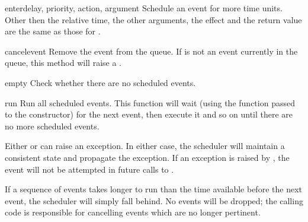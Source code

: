 \begin{methoddesc}{enter}{delay, priority, action, argument}
Schedule an event for  more time units. Other then the
relative time, the other arguments, the effect and the return value
are the same as those for .
\end{methoddesc}

\begin{methoddesc}{cancel}{event}
Remove the event from the queue. If  is not an event
currently in the queue, this method will raise a
.
\end{methoddesc}

\begin{methoddesc}{empty}{}
Check whether there are no scheduled events.
\end{methoddesc}

\begin{methoddesc}{run}{}
Run all scheduled events. This function will wait 
(using the  function passed to the constructor)
for the next event, then execute it and so on until there are no more
scheduled events.

Either  or  can raise an exception.  In
either case, the scheduler will maintain a consistent state and
propagate the exception.  If an exception is raised by ,
the event will not be attempted in future calls to .

If a sequence of events takes longer to run than the time available
before the next event, the scheduler will simply fall behind.  No
events will be dropped; the calling code is responsible for cancelling 
events which are no longer pertinent.
\end{methoddesc}
